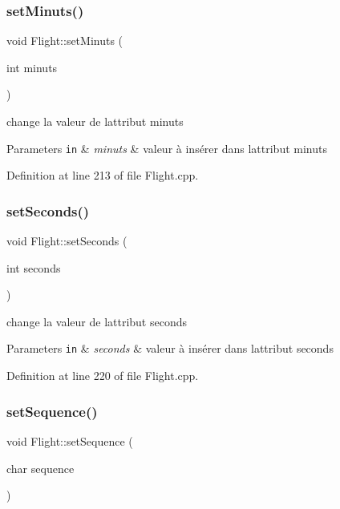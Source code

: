 \subsubsection{\texorpdfstring{set\+Minuts()}{setMinuts()}}
{\footnotesize\ttfamily void Flight\+::set\+Minuts (\begin{DoxyParamCaption}\item[{int}]{minuts }\end{DoxyParamCaption})}



change la valeur de l\textquotesingle{}attribut minuts 


\begin{DoxyParams}[1]{Parameters}
\mbox{\tt in}  & {\em minuts} & valeur à insérer dans l\textquotesingle{}attribut minuts \\
\hline
\end{DoxyParams}


Definition at line 213 of file Flight.\+cpp.

\mbox{\label{class_flight_ad26c2a5811f5cebb5955946bb6f93cca}} 
\subsubsection{\texorpdfstring{set\+Seconds()}{setSeconds()}}
{\footnotesize\ttfamily void Flight\+::set\+Seconds (\begin{DoxyParamCaption}\item[{int}]{seconds }\end{DoxyParamCaption})}



change la valeur de l\textquotesingle{}attribut seconds 


\begin{DoxyParams}[1]{Parameters}
\mbox{\tt in}  & {\em seconds} & valeur à insérer dans l\textquotesingle{}attribut seconds \\
\hline
\end{DoxyParams}


Definition at line 220 of file Flight.\+cpp.

\mbox{\label{class_flight_a98d53d3ca75b71660f74a178df75bd3f}} 
\subsubsection{\texorpdfstring{set\+Sequence()}{setSequence()}}
{\footnotesize\ttfamily void Flight\+::set\+Sequence (\begin{DoxyParamCaption}\item[{char}]{sequence }\end{DoxyParamCaption})}



